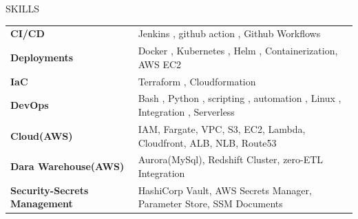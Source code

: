 \documentclass{resume} %
\begin{document}
\vspace{-1.25em} %
\begin{rSection}{SKILLS}

\begin{tabular}{ @{} >{\bfseries}l @{\hspace{6ex}} l }
CI/CD & Jenkins , github action , Github Workflows \\
Deployments & Docker , Kubernetes , Helm , Containerization, AWS EC2 \\
IaC & Terraform , Cloudformation  \\
DevOps & Bash , Python , scripting , automation , Linux , Integration , Serverless  \\
Cloud(AWS) &  IAM, Fargate, VPC, S3, EC2, Lambda, Cloudfront, ALB, NLB, Route53\\
Dara Warehouse(AWS) &  Aurora(MySql), Redshift Cluster, zero-ETL Integration   \\
Security-Secrets Management & HashiCorp Vault, AWS Secrets Manager, Parameter Store, SSM Documents\\
\end{tabular}\\

\end{rSection}
\end{document}
